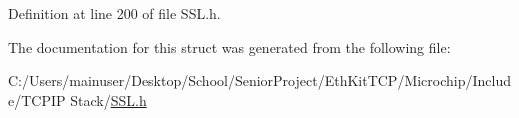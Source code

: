 Definition at line 200 of file S\+S\+L.\+h.



The documentation for this struct was generated from the following file\+:\begin{DoxyCompactItemize}
\item 
C\+:/\+Users/mainuser/\+Desktop/\+School/\+Senior\+Project/\+Eth\+Kit\+T\+C\+P/\+Microchip/\+Include/\+T\+C\+P\+I\+P Stack/\hyperlink{_s_s_l_8h}{S\+S\+L.\+h}\end{DoxyCompactItemize}
